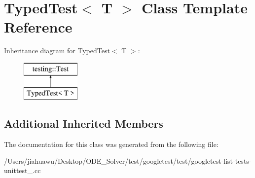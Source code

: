 \hypertarget{class_typed_test}{}\section{Typed\+Test$<$ T $>$ Class Template Reference}
\label{class_typed_test}
Inheritance diagram for Typed\+Test$<$ T $>$\+:\begin{figure}[H]
\begin{center}
\leavevmode
\includegraphics[height=2.000000cm]{class_typed_test}
\end{center}
\end{figure}
\subsection*{Additional Inherited Members}


The documentation for this class was generated from the following file\+:\begin{DoxyCompactItemize}
\item 
/\+Users/jiahuawu/\+Desktop/\+O\+D\+E\+\_\+\+Solver/test/googletest/test/googletest-\/list-\/tests-\/unittest\+\_\+.\+cc\end{DoxyCompactItemize}
